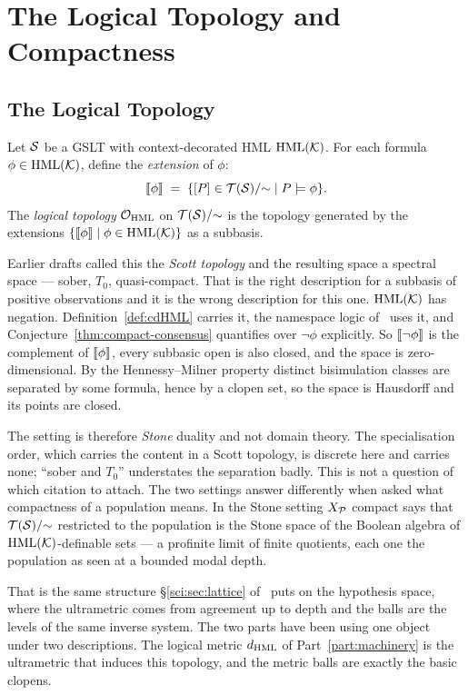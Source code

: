 \chapter{The Logical Topology and Compactness}
\label{sec:topology}

\section{The Logical Topology}

\begin{definition}
\label{def:log-top}
Let $\mathcal{S}$ be a GSLT with context-decorated HML $\mathrm{HML}(\mathcal{K})$.
For each formula $\phi \in \mathrm{HML}(\mathcal{K})$, define the
\emph{extension} of $\phi$:
\[
  \llbracket\phi\rrbracket \;=\; \{ [P] \in \mathcal{T}(\mathcal{S})/{\sim} \mid P \models \phi \}.
\]
The \emph{logical topology} $\mathcal{O}_{\mathrm{HML}}$ on
$\mathcal{T}(\mathcal{S})/{\sim}$ is the topology generated by the
extensions $\{ \llbracket\phi\rrbracket \mid \phi \in \mathrm{HML}(\mathcal{K}) \}$ as a
subbasis.
\end{definition}

\begin{remark}
\label{rmk:stone}
Earlier drafts called this the \emph{Scott topology} and the resulting
space a spectral space --- sober, $T_0$, quasi-compact.
That is the right description for a subbasis of positive observations
and it is the wrong description for this one.
$\mathrm{HML}(\mathcal{K})$ has negation.
Definition~\ref{def:cdHML} carries it, the namespace logic of \chSci\ uses
it, and Conjecture~\ref{thm:compact-consensus} quantifies over
$\neg\phi$ explicitly.
So $\llbracket \neg\phi \rrbracket$ is the complement of $\llbracket \phi \rrbracket$, every
subbasic open is also closed, and the space is zero-dimensional.
By the Hennessy--Milner property distinct bisimulation classes are
separated by some formula, hence by a clopen set, so the space is
Hausdorff and its points are closed.

The setting is therefore \emph{Stone} duality and not domain theory.
The specialisation order, which carries the content in a Scott
topology, is discrete here and carries none; ``sober and $T_0$''
understates the separation badly.
This is not a question of which citation to attach.
The two settings answer differently when asked what compactness of a
population means.
In the Stone setting $X_{\mathcal{P}}$ compact says that
$\mathcal{T}(\mathcal{S})/{\sim}$ restricted to the population is the Stone
space of the Boolean algebra of $\mathrm{HML}(\mathcal{K})$-definable sets --- a
profinite limit of finite quotients, each one the population as seen
at a bounded modal depth.

That is the same structure \S\ref{sci:sec:lattice} of \chSci\ puts on
the hypothesis space, where the ultrametric comes from agreement up to
depth and the balls are the levels of the same inverse system.
The two parts have been using one object under two descriptions.
The logical metric $d_{\mathrm{HML}}$ of Part~\ref{part:machinery} is the
ultrametric that induces this topology, and the metric balls are
exactly the basic clopens.
\end{remark}


